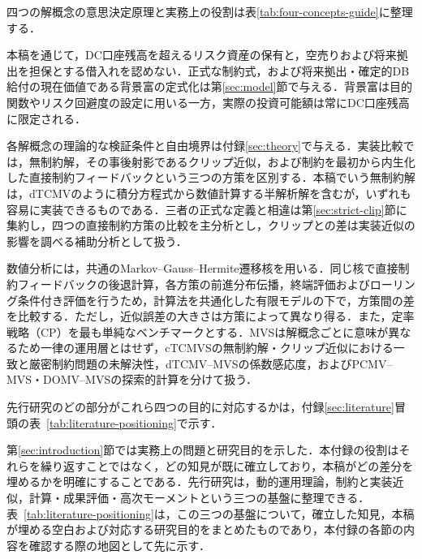 \documentclass[10pt,a4paper]{article}
\theoremstyle{plain}
\theoremstyle{definition}
\begin{document}
四つの解概念の意思決定原理と実務上の役割は表\ref{tab:four-concepts-guide}に整理する．

本稿を通じて，DC口座残高を超えるリスク資産の保有と，空売りおよび将来拠出を担保とする借入れを認めない．正式な制約式，および将来拠出・確定的DB給付の現在価値である背景富の定式化は第\ref{sec:model}節で与える．背景富は目的関数やリスク回避度の設定に用いる一方，実際の投資可能額は常にDC口座残高に限定される．

各解概念の理論的な検証条件と自由境界は付録\ref{sec:theory}で与える．実装比較では，無制約解，その事後射影であるクリップ近似，および制約を最初から内生化した直接制約フィードバックという三つの方策を区別する．本稿でいう無制約解は，dTCMVのように積分方程式から数値計算する半解析解を含むが，いずれも容易に実装できるものである．三者の正式な定義と相違は第\ref{sec:strict-clip}節に集約し，四つの直接制約方策の比較を主分析とし，クリップとの差は実装近似の影響を調べる補助分析として扱う．

数値分析には，共通のMarkov--Gauss--Hermite遷移核を用いる．同じ核で直接制約フィードバックの後退計算，各方策の前進分布伝播，終端評価およびローリング条件付き評価を行うため，計算法を共通化した有限モデルの下で，方策間の差を比較する．ただし，近似誤差の大きさは方策によって異なり得る．また，定率戦略（CP）を最も単純なベンチマークとする．MVSは解概念ごとに意味が異なるため一律の運用層とはせず，cTCMVSの無制約解・クリップ近似における一致と厳密制約問題の未解決性，dTCMV--MVSの係数感応度，およびPCMV--MVS・DOMV--MVSの探索的計算を分けて扱う．

先行研究のどの部分がこれら四つの目的に対応するかは，付録\ref{sec:literature}冒頭の表~\ref{tab:literature-positioning}で示す．



第\ref{sec:introduction}節では実務上の問題と研究目的を示した．本付録の役割はそれらを繰り返すことではなく，どの知見が既に確立しており，本稿がどの差分を埋めるかを明確にすることである．先行研究は，動的運用理論，制約と実装近似，計算・成果評価・高次モーメントという三つの基盤に整理できる．表~\ref{tab:literature-positioning}は，この三つの基盤について，確立した知見，本稿が埋める空白および対応する研究目的をまとめたものであり，本付録の各節の内容を確認する際の地図として先に示す．
\end{document}
